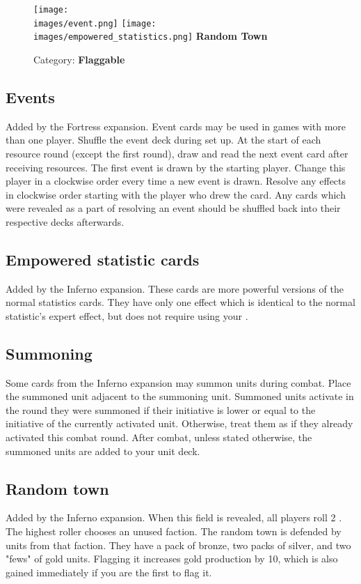 \clearpage
\begin{wrapfigure}{r}{0.5\textwidth}
    \begin{center}
    \texttt{[image: \\images/event.png]}
    \texttt{[image: \\images/empowered\_statistics.png]}
    \bigbreak
    \textbf{Random Town}
    \smallbreak
    \caption{Category: \textbf{Flaggable}}
    \end{center}
\end{wrapfigure}
\subsection*{Events}
Added by the Fortress expansion.
Event cards may be used in games with more than one player.
Shuffle the event deck during set up.
At the start of each resource round (except the first round), draw and read the next event card after receiving resources.
The first event is drawn by the starting player.
Change this player in a clockwise order every time a new event is drawn.
Resolve any effects in clockwise order starting with the player who drew the card.
Any cards which were revealed as a part of resolving an event should be shuffled back into their respective decks afterwards.
\subsection*{Empowered statistic cards}
Added by the Inferno expansion.
These cards are more powerful versions of the normal statistics cards.
They have only one effect which is identical to the normal statistic's expert effect, but does not require using your .

\subsection*{Summoning}
Some cards from the Inferno expansion may summon units during combat.
Place the summoned unit adjacent to the summoning unit.
Summoned units activate in the round they were summoned if their initiative is lower or equal to the initiative of the currently activated unit.
Otherwise, treat them as if they already activated this combat round.
After combat, unless stated otherwise, the summoned units are added to your unit deck.
\subsection*{Random town}
Added by the Inferno expansion.
When this field is revealed, all players roll 2 .
The highest roller chooses an unused faction.
The random town is defended by units from that faction.
They have a pack of bronze, two packs of silver, and two "fews" of gold units.
Flagging it increases gold production by 10, which is also gained immediately if you are the first to flag it.
